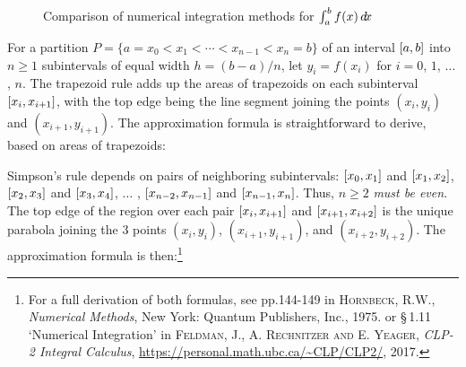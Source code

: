 \begin{figure}[ht]
{}
 \caption[]{\enskip Comparison of numerical integration methods for $\int_a^b f(x)\,d\!x$}
 \label{fig:nummethods}
\end{figure}

For a partition $P= \lbrace a=x_0 < x_1 < \cdots < x_{n-1} < x_n = b \rbrace$ of
an interval $\lbrack a,b \rbrack$ into $n \ge 1$ subintervals of equal width
$h = (b-a)/n$, let $y_i = f(x_i)$ for $i = 0$, $1$, $\ldots$, $n$.
The trapezoid rule adds up the areas of trapezoids on each subinterval
$\lbrack x_i,x_{i+1} \rbrack$, with the top edge being the line segment joining the
points $(x_i,y_i)$ and $(x_{i+1},y_{i+1})$. The approximation formula is
straightforward to derive, based on areas of trapezoids:


Simpson's rule depends on pairs of neighboring subintervals:
$\lbrack x_0,x_1 \rbrack$ and $\lbrack x_1,x_2 \rbrack$,
$\lbrack x_2,x_3 \rbrack$ and $\lbrack x_3,x_4 \rbrack$, $\ldots$ ,
$\lbrack x_{n-2},x_{n-1} \rbrack$ and $\lbrack x_{n-1},x_n \rbrack$.
Thus, $n \ge 2$ \emph{must be even}. The top edge of the region over each pair
$\lbrack x_{i},x_{i+1} \rbrack$ and $\lbrack x_{i+1},x_{i+2} \rbrack$ is the unique parabola
joining the 3 points $(x_i,y_i)$, $(x_{i+1},y_{i+1})$, and $(x_{i+2},y_{i+2})$.
The approximation formula is then:\footnote{For a full derivation of both
formulas, see pp.144-149 in \textsc{Hornbeck, R.W.}, \emph{Numerical Methods},
New York: Quantum Publishers, Inc., 1975. or \S\,1.11 `Numerical
Integration' in \textsc{Feldman, J., A. Rechnitzer and E. Yeager},
\emph{CLP-2 Integral Calculus},
\url{https://personal.math.ubc.ca/~CLP/CLP2/}, 2017.}

